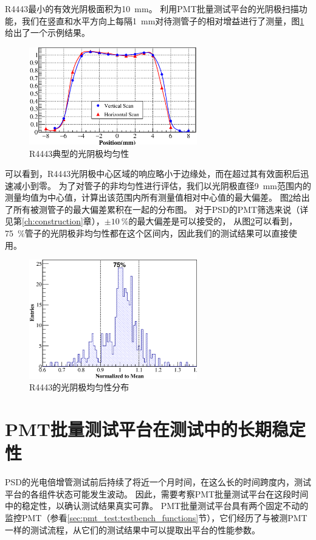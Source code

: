 R4443最小的有效光阴极面积为\SI{10}{mm}。
利用PMT批量测试平台的光阴极扫描功能，我们在竖直和水平方向上每隔\SI{1}{mm}对待测管子的相对增益进行了测量，图\ref{fig:pmt_test:cathode_uniformity}给出了一个示例结果。
\begin{figure}[htbp]
	\centering
	\includegraphics[width=0.65\textwidth]{chap/pmt_test/fig/cathode_uniformity.eps}
	\caption{R4443典型的光阴极均匀性}
	\label{fig:pmt_test:cathode_uniformity}
\end{figure}
可以看到，R4443光阴极中心区域的响应略小于边缘处，而在超过其有效面积后迅速减小到零。
为了对管子的非均匀性进行评估，我们以光阴极直径\SI{9}{mm}范围内的测量均值为中心值，计算出该范围内所有测量值相对中心值的最大偏差。
图\ref{fig:pmt_test:cathode_uniformity_distribution}给出了所有被测管子的最大偏差累积在一起的分布图。
对于PSD的PMT筛选来说（详见第\ref{ch:construction}章），$\pm\SI{10}{\percent}$的最大偏差是可以接受的，
从图\ref{fig:pmt_test:cathode_uniformity_distribution}可以看到，\SI{75}{\percent}管子的光阴极非均匀性都在这个区间内，因此我们的测试结果可以直接使用。

\begin{figure}[htbp]
	\centering
	\includegraphics[width=0.65\textwidth]{chap/pmt_test/fig/cathode_uniformity_distribution.eps}
	\caption{R4443的光阴极均匀性分布}
	\label{fig:pmt_test:cathode_uniformity_distribution}
\end{figure}

\section{PMT批量测试平台在测试中的长期稳定性}
\label{sec:pmt_test:testbench_performance}
PSD的光电倍增管测试前后持续了将近一个月时间，在这么长的时间跨度内，测试平台的各组件状态可能发生波动。
因此，需要考察PMT批量测试平台在这段时间中的稳定性，以确认测试结果真实可靠。
PMT批量测试平台具有两个固定不动的监控PMT（参看\ref{sec:pmt_test:testbench_functions}节），它们经历了与被测PMT一样的测试流程，从它们的测试结果中可以提取出平台的性能参数。

